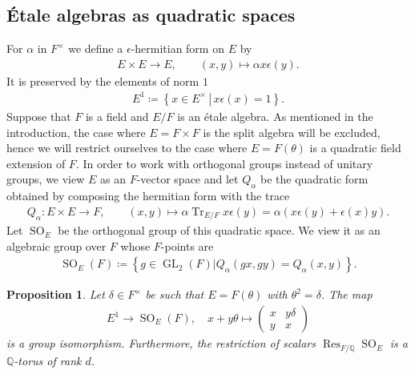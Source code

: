 \documentclass[11pt]{article} %
\newcommand{\8}{\infty}
\newcommand{\SO}{\operatorname{SO}}
\newcommand{\GL}{\operatorname{GL}}
\newcommand{\Q}{\mathbb{Q}}
\newcommand{\Tr}{\operatorname{Tr}}
\newcommand{\Res}{\operatorname{Res}}
\theoremstyle{mytheoremstyle}
\newtheorem{prop}[thm]{Proposition}
\theoremstyle{remark}
\numberwithin{equation}{section}
\begin{document}
\subsection{\'Etale algebras as quadratic spaces} \label{subsecetale} For $\alpha$ in $F^\times$ we define a $\epsilon$-hermitian form on $E$ by
\begin{align}
E \times E \longrightarrow E, \qquad
(x,y) \longmapsto \alpha x\epsilon(y).
\end{align}
 It is preserved by the elements of norm $1$
\begin{align}
E^1 \coloneqq \left \{ \left . x \in E^\times \, \right  \vert \, x\epsilon(x)=1 \right \}.
\end{align} 
Suppose that $F$ is a field and $E/F$ is an \'etale algebra. As { mentioned} in the introduction, the case where $E=F \times F$ is the split algebra will be excluded, hence we will restrict ourselves to the case where $E=F(\theta)$ is a quadratic field extension of $F$. In order to work with orthogonal groups instead of unitary groups, we view $E$ as an $F$-vector space and let $Q_\alpha$ be the quadratic form obtained by composing the hermitian form with the trace
\begin{align} \label{quadform2}
Q_\alpha \colon E \times E \longrightarrow F, \qquad
(x,y) \longmapsto \alpha \Tr_{E/F}x\epsilon(y)=\alpha(x\epsilon(y) + \epsilon(x)y).
\end{align}
Let $\SO_E$ be the orthogonal group of this quadratic space. We view it as an algebraic group over $F$ whose $F$-points are
\begin{align}
    \SO_E(F) \coloneqq \left \{\left . g \in \GL_2(F) \right \vert Q_\alpha(gx,gy)=Q_\alpha(x,y) \right \}.
\end{align}
\begin{prop} \label{Uismaxtor}
    Let $\delta \in F^\times$ be such that $E=F(\theta)$ with $\theta^2=\delta$. The map
    \begin{align}
    E^1  \longrightarrow \SO_E(F), \quad 
    x+y\theta \longmapsto \begin{pmatrix}
        x & y\delta \\ y & x
    \end{pmatrix}
\end{align}
is a group isomorphism. Furthermore, the restriction of scalars $ \Res_{F/\Q} \SO_E$ is a $\Q$-torus of rank $d$.
\end{prop}
\end{document}
